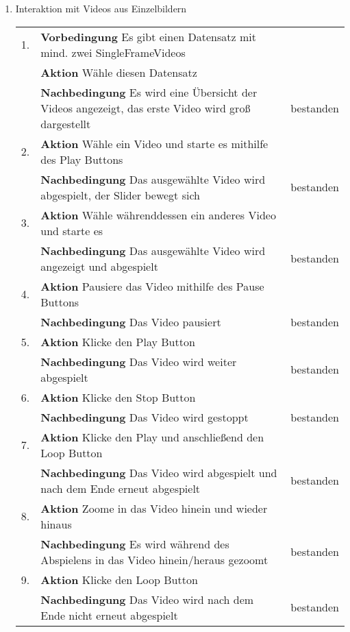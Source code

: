\begin{enumerate} [label=\bfseries /TS \arabic*0/, leftmargin=*]
	\item Interaktion mit Videos aus Einzelbildern \newline \newline
	\begin{tabular}{@{}rp{4in}|l}
	1. & \textbf{Vorbedingung} Es gibt einen Datensatz mit mind. zwei SingleFrameVideos & \\
	   & \textbf{Aktion} Wähle diesen Datensatz & \\
	   & \textbf{Nachbedingung} Es wird eine Übersicht der Videos angezeigt, das erste Video wird groß dargestellt & bestanden \\
	\hline
	2. & \textbf{Aktion} Wähle ein Video und starte es mithilfe des Play Buttons & \\
	   & \textbf{Nachbedingung} Das ausgewählte Video wird abgespielt, der Slider bewegt sich & bestanden \\
	\hline
	3. & \textbf{Aktion} Wähle währenddessen ein anderes Video und starte es & \\
	   & \textbf{Nachbedingung} Das ausgewählte Video wird angezeigt und abgespielt & bestanden \\
	\hline
	4. & \textbf{Aktion} Pausiere das Video mithilfe des Pause Buttons & \\
	   & \textbf{Nachbedingung} Das Video pausiert & bestanden \\
	\hline
	5. & \textbf{Aktion} Klicke den Play Button & \\
	   & \textbf{Nachbedingung} Das Video wird weiter abgespielt & bestanden \\
	\hline
	6. & \textbf{Aktion} Klicke den Stop Button & \\
	   & \textbf{Nachbedingung} Das Video wird gestoppt & bestanden \\
	\hline
	7. & \textbf{Aktion} Klicke den Play und anschließend den Loop Button & \\
	   & \textbf{Nachbedingung} Das Video wird abgespielt und nach dem Ende erneut abgespielt & bestanden \\
	\hline
	8. & \textbf{Aktion} Zoome in das Video hinein und wieder hinaus & \\
	   & \textbf{Nachbedingung} Es wird während des Abspielens in das Video hinein/heraus gezoomt & bestanden \\
	\hline
	9. & \textbf{Aktion} Klicke den Loop Button & \\
	   & \textbf{Nachbedingung} Das Video wird nach dem Ende nicht erneut abgespielt & bestanden \\

\end{tabular}
\end{enumerate}
